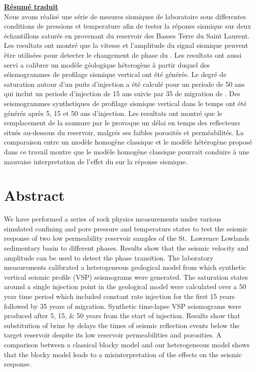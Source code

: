 {\underline{\textbf{Résumé traduit}}\\
Nous avons réalisé une série de mesures sismiques de laboratoire sous
differentes conditions de pressions et temperature afin de tester la réponse
sismique sur deux échantillons saturés en  provenant du reservoir des
Basses Terre du Saint Laurent. Les resultats ont montré que la vitesse et
l'amplitude du signal sismique peuvent être utilisées pour detecter le changement
de phase du . Les resultats ont aussi servi a calibrer un modèle
géologique héterogène à partir duquel des séismogrammes de profilage sismique vertical ont été générés. Le degré de saturation  autour d'un puits
d'injection a été calculé pour un periode de  \num{50} ans qui inclut
un periode d'injection de \num{15} ans suivie par \num{35} de migration de
. Des seismogrammes synthetiques de profilage sismique vertical dans le
temps ont été générés après 5, 15 et 50 ans d'injection. Les resultats ont montré que le
remplacement de la saumure par le  provoque un délai en temps des
reflecteurs situés au-dessous du reservoir, malgrés ses faibles porosités et
perméabilités. La comparaison entre un modèle homogène classique et le modèle
hétérogène proposé dans ce travail montre que le modèle homogène classique
pourrait conduire à une mauvaise interpretation de l'effet du  sur la
réponse sismique.
}

\section{Abstract}
We have performed a series of rock physics measurements under various simulated
confining and pore pressure and temperature states to test the seismic response
of two low permeability reservoir samples of the St.\ Lawrence Lowlands
sedimentary basin to different  phases. Results show that the seismic
velocity and amplitude can be used to detect the  phase transition. The
laboratory measurements calibrated a heterogeneous geological model from which
synthetic vertical seismic profile (VSP) seismograms were generated. The
saturation states around a single injection point in the geological model were
calculated over a \num{50} year time period which included constant rate
injection for the first \num{15} years followed by \num{35} years of 
migration. Synthetic time-lapse VSP seismograms were produced after
\numlist{5;15;50} years from the start of injection. Results show that
substitution of brine by  delays the times of seismic reflection events
below the target reservoir despite its low reservoir permeabilities and
porosities. A comparison between a classical blocky model and our heterogeneous
model shows that the blocky model leads to a misinterpretation of the 
effects on the seismic response.

